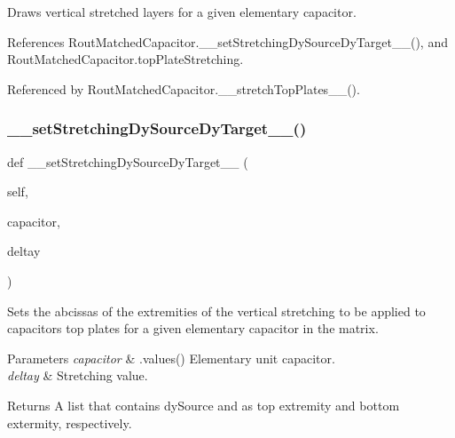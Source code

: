 Draws vertical stretched layers for a given elementary capacitor. 



References Rout\+Matched\+Capacitor.\+\_\+\+\_\+set\+Stretching\+Dy\+Source\+Dy\+Target\+\_\+\+\_\+(), and Rout\+Matched\+Capacitor.\+top\+Plate\+Stretching.



Referenced by Rout\+Matched\+Capacitor.\+\_\+\+\_\+stretch\+Top\+Plates\+\_\+\+\_\+().

\mbox{\label{classpython_1_1capacitorrouted_1_1RoutMatchedCapacitor_a502017c18e8b268a07ff7f861dfb0e20}} 
\subsubsection{\texorpdfstring{\+\_\+\+\_\+set\+Stretching\+Dy\+Source\+Dy\+Target\+\_\+\+\_\+()}{\_\_setStretchingDySourceDyTarget\_\_()}}
{\footnotesize\ttfamily def \+\_\+\+\_\+set\+Stretching\+Dy\+Source\+Dy\+Target\+\_\+\+\_\+ (\begin{DoxyParamCaption}\item[{}]{self,  }\item[{}]{capacitor,  }\item[{}]{deltay }\end{DoxyParamCaption})}



Sets the abcissas of the extremities of the vertical stretching to be applied to capacitor\textquotesingle{}s top plates for a given elementary capacitor in the matrix. 


\begin{DoxyParams}{Parameters}
{\em capacitor} & .values() Elementary unit capacitor. \\
\hline
{\em deltay} & Stretching value. \\
\hline
\end{DoxyParams}
\begin{DoxyReturn}{Returns}
A list that contains {\ttfamily dy\+Source} and  as top extremity and bottom extermity, respectively. 
\end{DoxyReturn}


